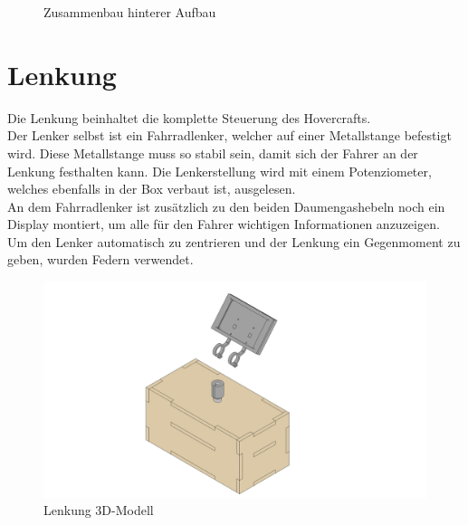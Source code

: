 \begin{figure}[H]
\begin{minipage}{0.486\textwidth}
    \end{minipage}
    \caption{Zusammenbau hinterer Aufbau \label{fig:kosnt:aufbau:zusammenbau}}
\end{figure}

\clearpage
\section{Lenkung}
Die Lenkung beinhaltet die komplette Steuerung des Hovercrafts.\\
Der Lenker selbst ist ein Fahrradlenker, welcher auf einer Metallstange befestigt wird. Diese Metallstange muss so stabil sein, damit sich der Fahrer an der Lenkung festhalten kann. Die Lenkerstellung wird mit einem Potenziometer, welches ebenfalls in der Box verbaut ist, ausgelesen.\\
An dem Fahrradlenker ist zusätzlich zu den beiden Daumengashebeln noch ein Display montiert, um alle für den Fahrer wichtigen Informationen anzuzeigen.\\
Um den Lenker automatisch zu zentrieren und der Lenkung ein Gegenmoment zu geben, wurden Federn verwendet.
\begin{figure}[H]
    \centering
    \includegraphics[width=1.25\textwidth]{../Inventor/Lenker/png/Lenkung_Hauptansicht.png}
    \caption{Lenkung 3D-Modell}
\end{figure}

\clearpage
